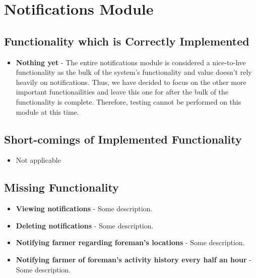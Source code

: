 \documentclass[11pt,fleqn]{book} %
\begin{document}


\chapter{Notifications Module}
	\section{Functionality which is Correctly Implemented}
		\begin{itemize}
			\item\textbf{Nothing yet} -
			The entire notifications module is considered a nice-to-hve functionality as the bulk of the system's functionality and value doesn't rely heavily on notifications. Thus, we have decided to focus on the other more important functionailities and leave this one for after the bulk of the functionality is complete. Therefore, testing cannot be performed on this module at this time.
		\end{itemize}
	\section{Short-comings of Implemented Functionality}
		\begin{itemize}
			\item{Not applicable}
		\end{itemize}
	\section{Missing Functionality}
		\begin{itemize}
			\item\textbf{Viewing notifications} -
			Some description.
			
			\item\textbf{Deleting notifications} -
			Some description.
			
			\item\textbf{Notifying farmer regarding foreman’s locations} -
			Some description.
			
			\item\textbf{Notifying farmer of foreman’s activity history every half an hour} -
			Some description.			
		\end{itemize}
	
\end{document}
